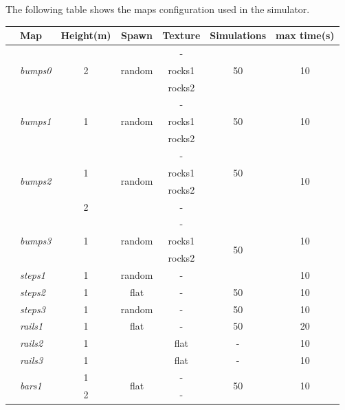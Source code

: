 \documentclass[../document.tex]{subfiles}
\begin{document}
The following table shows the maps configuration used in the simulator.
\begin{table}[H]
    \centering
    
    \begin{tabular}[]{@{}llccccc@{}}
      \toprule
      & Map & Height(m) & Spawn & Texture & Simulations & max time(s) \\ 
      \hline
      &\multirow{3}{*}{\emph{bumps0}} & \multirow{3}{*}{2} & \multirow{3}{*}{random} &- & \multirow{3}{*}{50} & \multirow{3}{*}{10} \\
      &&&& rocks1 &  &  \\ 
      &&&& rocks2 &  &  \\ 
      \hline
      &\multirow{3}{*}{\emph{bumps1}} & \multirow{3}{*}{1} & \multirow{3}{*}{random}& - & \multirow{3}{*}{50} & \multirow{3}{*}{10} \\
      &&&& rocks1 &  &  \\ 
      &&&& rocks2 &  &  \\ 
      \hline
      &\multirow{4}{*}{\emph{bumps2}} & \multirow{3}{*}{1} & \multirow{4}{*}{random} &- & \multirow{3}{*}{50} & \multirow{4}{*}{10} \\
      &&&& rocks1 &  &  \\ 
      &&&& rocks2 &  &  \\ 
      && 2 && - &  &  \\ 
      \hline
      &\multirow{3}{*}{\emph{bumps3}} & \multirow{3}{*}{1}& \multirow{3}{*}{random} & - & \multirow{4}{*}{50} & \multirow{3}{*}{10} \\
      &&&& rocks1 &  &  \\ 
      &&&& rocks2 &  &  \\ 
      \hline
      &\emph{steps1} & 1 &random & - & 50 & 10 \\
      \hline
      &\emph{steps2} & 1 &flat & - & 50  &  10\\
      \hline
      &\emph{steps3} & 1 &random & - & 50  &  10\\
      \hline
      &\emph{rails1} & 1 & flat & - & 50 & 20 \\
      \hline
      &\emph{rails2} & 1 && flat & - & 10 \\
      \hline
      &\emph{rails3} & 1 &&  flat&  - & 10 \\
      \hline
      &\multirow{2}{*}{\emph{bars1}} & 1 & \multirow{2}{*}{flat} & - & \multirow{2}{*}{50} & \multirow{2}{*}{10} \\
      && 2 &  & - &  &  \\

\end{tabular}
\end{table}
\end{document}
